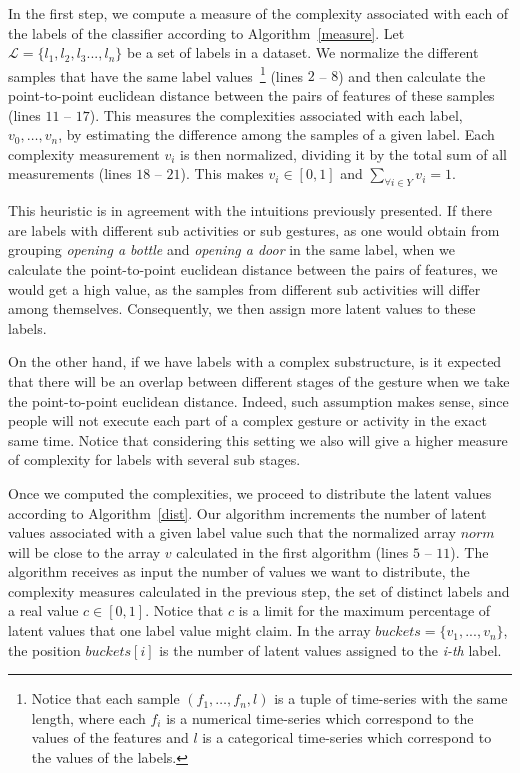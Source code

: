 \documentclass[10pt, conference]{IEEEtran}
\begin{document}
In the first step, we compute a measure of the complexity associated with each of the labels of the classifier according to Algorithm~\ref{measure}. 
Let $\mathcal{L}=\{l_1,l_2,l_3..., l_n\}$ be a set of labels in a dataset. We normalize the different samples that have the same label values~\footnote{Notice that each sample $(f_1,\ldots,f_n,l)$ is a tuple of time-series with the same length, where each $f_i$ is a numerical time-series which correspond to the values of the features and $l$ is a categorical time-series which correspond to the values of the labels.} (lines $2$ -- $8$) and then calculate the point-to-point euclidean distance between the pairs of features of these samples (lines $11$ -- $17$). This measures the complexities associated with each label, $v_0, \ldots, v_n$,  by estimating the difference among the samples of a given label. Each complexity measurement $v_i$ is then normalized, dividing it by the total sum of all measurements (lines $18$ -- $21$). This makes $v_{i} \in [0,1]$ and  $\sum_{\forall i \in Y} v_i = 1$. 

This heuristic is in agreement with the intuitions previously presented. If there are labels with different sub activities or sub gestures, as one would obtain from grouping \textit{opening a bottle} and \textit{opening a door} in the same label, when we calculate the point-to-point euclidean distance between the pairs of features, we would get a high value, as the samples from different sub activities will differ among themselves. Consequently, we then assign more latent values to these labels. 

On the other hand, if we have labels with a complex substructure, is it expected that there will be an overlap between different stages of the gesture when we take the point-to-point euclidean distance. Indeed, such assumption makes sense, since people will not execute each part of a complex gesture or activity in the exact same time. Notice that considering this setting we also will give a higher measure of complexity for labels with several sub stages.

Once we computed the complexities, we proceed to distribute the latent values according to Algorithm~\ref{dist}.
Our algorithm increments the number of latent values associated with a given label value such that the normalized array $norm$ will be close to the array $v$ calculated in the first algorithm (lines $5$ -- $11$). The algorithm receives as input the number of values we want to distribute, the complexity measures calculated in the previous step, the set of distinct labels and a real value $c\in[0,1]$. Notice that $c$  is a limit for the maximum percentage of latent values that one label value might claim. In the array $buckets=\{v_1,...,v_n\}$, the position $buckets[i]$ is the number of latent values assigned to the \textit{i-th} label. 
\end{document}
